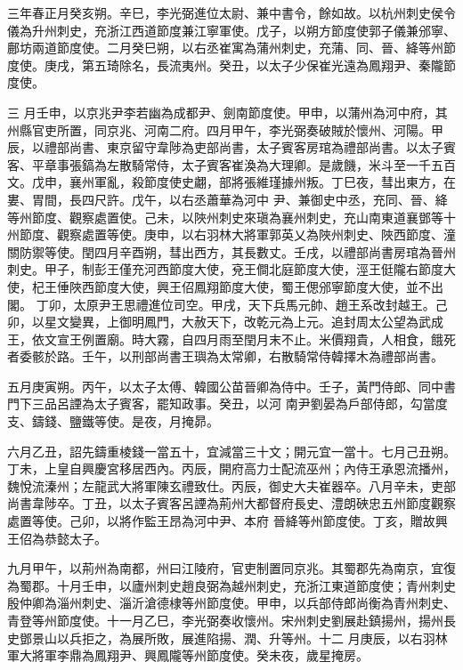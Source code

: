 \begin{pinyinscope}
 三年春正月癸亥朔。辛巳，李光弼進位太尉、兼中書令，餘如故。以杭州刺史侯令儀為升州刺史，充浙江西道節度兼江寧軍使。戊子，以朔方節度使郭子儀兼邠寧、鄜坊兩道節度使。二月癸巳朔，以右丞崔寓為蒲州刺史，充蒲、同、晉、絳等州節度使。庚戌，第五琦除名，長流夷州。癸丑，以太子少保崔光遠為鳳翔尹、秦隴節度使。



 三
 月壬申，以京兆尹李若幽為成都尹、劍南節度使。甲申，以蒲州為河中府，其州縣官吏所置，同京兆、河南二府。四月甲午，李光弼奏破賊於懷州、河陽。甲辰，以禮部尚書、東京留守韋陟為吏部尚書，太子賓客房琯為禮部尚書。以太子賓客、平章事張鎬為左散騎常侍，太子賓客崔渙為大理卿。是歲饑，米斗至一千五百文。戊申，襄州軍亂，殺節度使史翽，部將張維瑾據州叛。丁巳夜，彗出東方，在婁、胃間，長四尺許。戊午，以右丞蕭華為河中
 尹、兼御史中丞，充同、晉、絳等州節度、觀察處置使。己未，以陜州刺史來瑱為襄州刺史，充山南東道襄鄧等十州節度、觀察處置等使。庚申，以右羽林大將軍郭英乂為陜州刺史、陜西節度、潼關防禦等使。閏四月辛酉朔，彗出西方，其長數丈。壬戌，以禮部尚書房琯為晉州刺史。甲子，制彭王僅充河西節度大使，兗王僴北庭節度大使，涇王侹隴右節度大使，杞王倕陜西節度大使，興王佋鳳翔節度大使，蜀王偲邠寧節度大使，並不出閣。
 丁卯，太原尹王思禮進位司空。甲戌，天下兵馬元帥、趙王系改封越王。己卯，以星文變異，上御明鳳門，大赦天下，改乾元為上元。追封周太公望為武成王，依文宣王例置廟。時大霧，自四月雨至閏月末不止。米價翔貴，人相食，餓死者委骸於路。壬午，以刑部尚書王璵為太常卿，右散騎常侍韓擇木為禮部尚書。



 五月庚寅朔。丙午，以太子太傅、韓國公苗晉卿為侍中。壬子，黃門侍郎、同中書門下三品呂諲為太子賓客，罷知政事。癸丑，以河
 南尹劉晏為戶部侍郎，勾當度支、鑄錢、鹽鐵等使。是夜，月掩昴。



 六月乙丑，詔先鑄重棱錢一當五十，宜減當三十文；開元宜一當十。七月己丑朔。丁未，上皇自興慶宮移居西內。丙辰，開府高力士配流巫州；內侍王承恩流播州，魏悅流溱州；左龍武大將軍陳玄禮致仕。丙辰，御史大夫崔器卒。八月辛未，吏部尚書韋陟卒。丁丑，以太子賓客呂諲為荊州大都督府長史、澧朗硤忠五州節度觀察處置等使。己卯，以將作監王昂為河中尹、本府
 晉絳等州節度使。丁亥，贈故興王佋為恭懿太子。



 九月甲午，以荊州為南都，州曰江陵府，官吏制置同京兆。其蜀郡先為南京，宜復為蜀郡。十月壬申，以廬州刺史趙良弼為越州刺史，充浙江東道節度使；青州刺史殷仲卿為淄州刺史、淄沂滄德棣等州節度使。甲申，以兵部侍郎尚衡為青州刺史、青登等州節度使。十一月乙巳，李光弼奏收懷州。宋州刺史劉展赴鎮揚州，揚州長史鄧景山以兵拒之，為展所敗，展進陷揚、潤、升等州。十二
 月庚辰，以右羽林軍大將軍李鼎為鳳翔尹、興鳳隴等州節度使。癸未夜，歲星掩房。




\end{pinyinscope}
